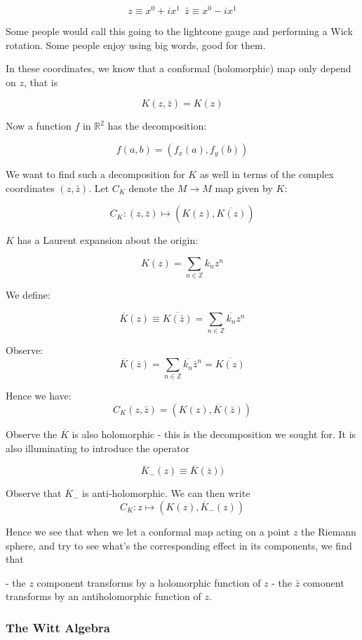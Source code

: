$$ z \equiv x^0 + i x^1 ~~ \bar{z}\equiv x^0 - i x^1$$

Some people would call this going to the lightcone gauge and performing a Wick rotation. Some people enjoy using big words, good for them. 

In these coordinates, we know that a conformal (holomorphic) map only depend on $z$, that is

$$ K(z, \bar z) = K(z)$$

Now a function $f$ in $\mathbb{R}^2$ has the decomposition:

$$f(a, b) = (f_x(a), f_y(b))$$

We want to find such a decomposition for $K$ as well in terms of the complex coordinates $(z, \bar z)$. Let $C_K$ denote the $M \to M$ map given by  $K$:

$$C_K: (z, \bar z) \mapsto (K(z), \overline{K(z)})$$
 
$K$ has a Laurent expansion about the origin:

$$K(z) = \sum_{n \in \mathbb{Z}} k_n z^n$$

We define:

$$\overline{K}(z) \equiv \overline{K(\bar z)} = \sum_{n \in \mathbb{Z}} \overline{k_n} {z}^n$$

Observe:
$$\overline{K}(\overline z) =\sum_{n \in \mathbb{Z}} \overline{k_n} \bar{z}^n = \overline{K(z)} $$

Hence we have:
$$C_K(z, \bar z) = (K(z), \overline K(\bar z))$$

Observe the $\overline K$ is also holomorphic - this is the decomposition we sought for. It is also illuminating to introduce the operator

$$\overline K_
-(z) \equiv  \overline K(\bar z))$$

Observe that $\overline K_-$ is anti-holomorphic. We can then write
$$C_K: z \mapsto (K(z), \overline K_
-( z))$$


Hence we see that when we let a conformal map acting on a point $z$ the Riemann sphere, and try to see what's the corresponding effect in its components, we find that

- the $z$ component transforms by a holomorphic function of $z$
-  the $\bar z$ comonent  transforms by an antiholomorphic function of $z$.

\subsubsection{ The Witt Algebra}

